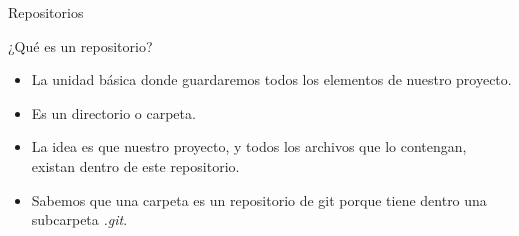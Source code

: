             


    



\begin{frame}{Repositorios}
    \begin{block}{¿Qué es un repositorio?}
    \begin{itemize}
        \pause
        \item La unidad básica donde guardaremos todos los elementos de nuestro proyecto.
        \pause
        \item Es un directorio o carpeta.
        \pause
        \item La idea es que nuestro proyecto, y todos los archivos que lo contengan, existan dentro de este repositorio.
        \pause
        \item Sabemos que una carpeta es un repositorio de git porque tiene dentro una subcarpeta \textit{.git}.
    \end{itemize}

    \end{block}
\end{frame}


